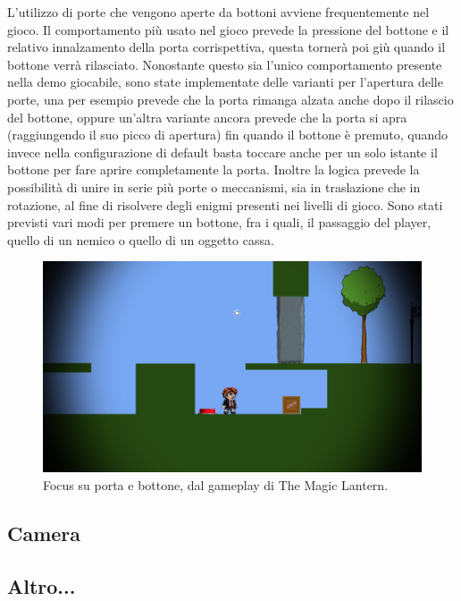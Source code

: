 L'utilizzo di porte che vengono aperte da bottoni avviene frequentemente nel gioco. Il comportamento più usato nel gioco prevede la pressione del bottone e il relativo innalzamento della porta corrispettiva, questa tornerà poi giù quando il bottone verrà rilasciato. Nonostante questo sia l'unico comportamento presente nella demo giocabile, sono state implementate delle varianti per l'apertura delle porte, una per esempio prevede che la porta rimanga alzata anche dopo il rilascio del bottone, oppure un'altra variante ancora prevede che la porta si apra (raggiungendo il suo picco di apertura) fin quando il bottone è premuto, quando invece nella configurazione di default basta toccare anche per un solo istante il bottone per fare aprire completamente la porta. Inoltre la logica prevede la possibilità di unire in serie più porte o meccanismi, sia in traslazione che in rotazione, al fine di risolvere degli enigmi presenti nei livelli di gioco. Sono stati previsti vari modi per premere un bottone, fra i quali, il passaggio del player, quello di un nemico o quello di un oggetto cassa.

\begin{figure}[h]
\centerline{\includegraphics[scale=0.35]{images/development/portaebottone.png}}
\caption{Focus su porta e bottone, dal gameplay di The Magic Lantern.}
\label{fig:portaebottone}
\end{figure}

\subsection{Camera}

\subsection{Altro...}

